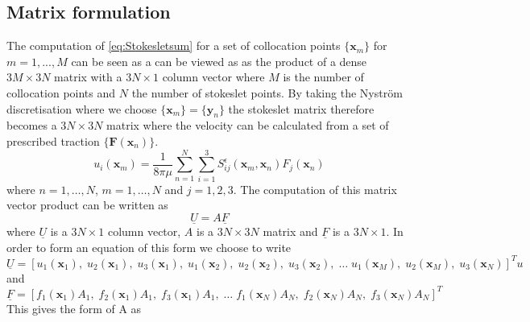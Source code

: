 \subsection{Matrix formulation}
The computation of \cref{eq:Stokesletsum} for a set of collocation points $\{\bm{x}_m\}$  for $m = 1,...,M$ can be seen as a 
can be viewed as as the product of a dense $3M \times 3N$ matrix with a $3N \times 1$ column vector where $M$ is the number of collocation points and $N$ the number of stokeslet points. By taking the Nyström discretisation where we choose $\{\bm{x}_m\} = \{\bm{y}_n\}$ the stokeslet matrix therefore becomes a $3N \times 3N$ matrix where the velocity can be calculated from a set of prescribed traction $\{\bm{F}(\bm{x}_n)\}$. 
\begin{equation}
\label{eq:Nystrom}
    u_{i}\left(\bm{x}_m\right)=\frac{1}{8 \pi \mu} \sum_{n=1}^{N} \sum_{i=1}^{3} S_{i j}^{\epsilon}\left(\bm{x}_m, {\bm{x}}_{n}\right) {F}_{j}({\bm{x}}_{n})
\end{equation}
where $n=1,\dots,N$, $m=1,\dots,N$ and $j=1,2,3$. The computation of this matrix vector product can be written as 
\begin{equation}
\label{eq:matrixvectorproduct}
    \underline{U} = A \underline{F}
\end{equation}
where $\underline{U}$ is a $3N \times 1$ column vector, $A$ is a $3N \times 3N$ matrix and $\underline{F}$ is a $3N \times 1$. In order to form an equation of this form we choose to write 
\small
\begin{equation*}
    \underline{U} = [u_1({\bm{x}}_{1}), \; u_2({\bm{x}}_{1}), \; u_3({\bm{x}}_{1}), \; u_1({\bm{x}}_{2}), \; u_2({\bm{x}}_{2}), \; u_3({\bm{x}}_{2}), \; \dots \; u_1({\bm{x}}_{M}), \; u_2({\bm{x}}_{M}), \; u_3({\bm{x}}_{N})]^{T}u
\end{equation*}
\normalsize
and 
\small
\begin{equation*}
    \underline{F} = [{f}_{1}({\bm{x}}_{1})A_1, \; {f}_{2}({\bm{x}}_{1})A_1, \; {f}_{3}({\bm{x}}_{1})A_1,\; \dots \; {f}_{1}({\bm{x}}_{N})A_N, \; {f}_{2}({\bm{x}}_{N})A_N, \; f_{3}({\bm{x}}_{N})A_N]^{T}
\end{equation*}
\normalsize
This gives the form of A as 
\small
